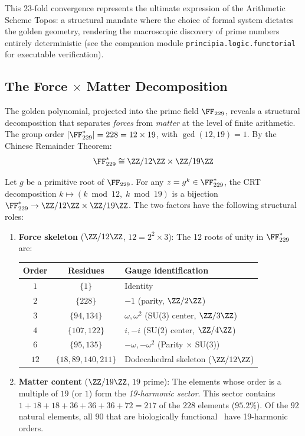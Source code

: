 This 23-fold convergence represents the ultimate expression of the Arithmetic Scheme Topos: a structural mandate where the choice of formal system dictates the golden geometry, rendering the macroscopic discovery of prime numbers entirely deterministic (see the companion module \texttt{principia.logic.functorial} for executable verification).

\subsection{The Force $\times$ Matter Decomposition}\label{sec:force-matter}

The golden polynomial, projected into the prime field $\FF_{229}$, reveals a structural decomposition that separates \emph{forces} from \emph{matter} at the level of finite arithmetic. The group order $|\FF_{229}^*| = 228 = 12 \times 19$, with $\gcd(12, 19) = 1$. By the Chinese Remainder Theorem:
\begin{equation}\label{eq:crt}
\FF_{229}^* \cong \ZZ/12\ZZ \times \ZZ/19\ZZ
\end{equation}

\begin{theorem}\label{thm:force-matter}
Let $g$ be a primitive root of $\FF_{229}$. For any $z = g^k \in \FF_{229}^*$, the CRT decomposition $k \mapsto (k \bmod 12,\; k \bmod 19)$ is a bijection $\FF_{229}^* \to \ZZ/12\ZZ \times \ZZ/19\ZZ$. The two factors have the following structural roles:
\begin{enumerate}
\item \textbf{Force skeleton} ($\ZZ/12\ZZ$, $12 = 2^2 \times 3$): The 12 roots of unity in $\FF_{229}^*$ are:
\begin{center}
\begin{tabular}{@{}ccl@{}}
\toprule
\textbf{Order} & \textbf{Residues} & \textbf{Gauge identification} \\
\midrule
$1$ & $\{1\}$ & Identity \\
$2$ & $\{228\}$ & $-1$ (parity, $\ZZ/2\ZZ$) \\
$3$ & $\{94, 134\}$ & $\omega, \omega^2$ (SU(3) center, $\ZZ/3\ZZ$) \\
$4$ & $\{107, 122\}$ & $i, -i$ (SU(2) center, $\ZZ/4\ZZ$) \\
$6$ & $\{95, 135\}$ & $-\omega, -\omega^2$ (Parity $\times$ SU(3)) \\
$12$ & $\{18, 89, 140, 211\}$ & Dodecahedral skeleton ($\ZZ/12\ZZ$) \\
\bottomrule
\end{tabular}
\end{center}

\item \textbf{Matter content} ($\ZZ/19\ZZ$, $19$ prime): The elements whose order is a multiple of $19$ (or $1$) form the \emph{19-harmonic sector}. This sector contains $1 + 18 + 18 + 36 + 36 + 36 + 72 = 217$ of the $228$ elements ($95.2\%$). Of the $92$ natural elements, all $90$ that are biologically functional~\cite{FraustoDaSilva2001} have 19-harmonic orders.
\end{enumerate}
\end{theorem}

